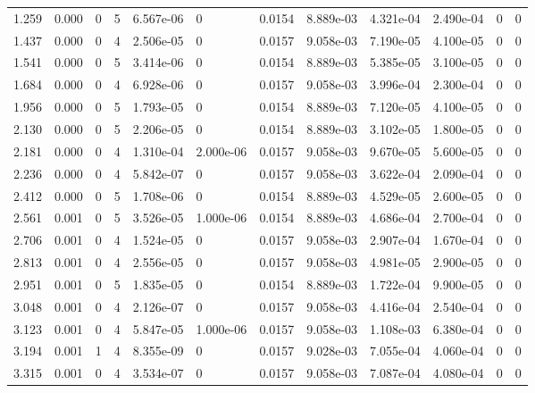 \documentclass[preview]{standalone}
\begin{document}
{{\begin{tabular}{L{1.2cm}C{1.2cm} C{0.3cm}C{0.5cm} C{1.4cm}C{1.4cm} C{1.4cm}C{1.4cm} C{1.6cm}C{1.6cm} C{1.6cm}C{1.6cm}}
  1.259  &  0.000  & 0     &  5 &  6.567e-06  & 0  &  0.0154&   8.889e-03& 4.321e-04 & 2.490e-04   &  0 & 0  \\ 
  1.437  &  0.000  & 0     &  4 &  2.506e-05  & 0  &  0.0157&   9.058e-03& 7.190e-05 & 4.100e-05   &  0 & 0  \\ 
  1.541  &  0.000  & 0     &  5 &  3.414e-06  & 0  &  0.0154&   8.889e-03& 5.385e-05 & 3.100e-05   &  0 & 0  \\ 
  1.684  &  0.000  & 0     &  4 &  6.928e-06  & 0  &  0.0157&   9.058e-03& 3.996e-04 & 2.300e-04   &  0 & 0  \\ 
  1.956  &  0.000  & 0     &  5 &  1.793e-05  & 0  &  0.0154&   8.889e-03& 7.120e-05 & 4.100e-05   &  0 & 0  \\ 
  2.130  &  0.000  & 0     &  5 &  2.206e-05  & 0  &  0.0154&   8.889e-03& 3.102e-05 & 1.800e-05   &  0 & 0  \\ 
  2.181  &  0.000  & 0     &  4 &  1.310e-04  & 2.000e-06  &  0.0157&   9.058e-03& 9.670e-05 & 5.600e-05   &  0 & 0  \\ 
  2.236  &  0.000  & 0     &  4 &  5.842e-07  & 0  &  0.0157&   9.058e-03& 3.622e-04 & 2.090e-04   &  0 & 0  \\ 
  2.412  &  0.000  & 0     &  5 &  1.708e-06  & 0  &  0.0154&   8.889e-03& 4.529e-05 & 2.600e-05   &  0 & 0  \\ 
  2.561  &  0.001  & 0     &  5 &  3.526e-05  & 1.000e-06  &  0.0154&   8.889e-03& 4.686e-04 & 2.700e-04   &  0 & 0  \\ 
  2.706  &  0.001  & 0     &  4 &  1.524e-05  & 0  &  0.0157&   9.058e-03& 2.907e-04 & 1.670e-04   &  0 & 0  \\ 
  2.813  &  0.001  & 0     &  4 &  2.556e-05  & 0  &  0.0157&   9.058e-03& 4.981e-05 & 2.900e-05   &  0 & 0  \\ 
  2.951  &  0.001  & 0     &  5 &  1.835e-05  & 0  &  0.0154&   8.889e-03& 1.722e-04 & 9.900e-05   &  0 & 0  \\ 
  3.048  &  0.001  & 0     &  4 &  2.126e-07  & 0  &  0.0157&   9.058e-03& 4.416e-04 & 2.540e-04   &  0 & 0  \\ 
  3.123  &  0.001  & 0     &  4 &  5.847e-05  & 1.000e-06  &  0.0157&   9.058e-03& 1.108e-03 & 6.380e-04   &  0 & 0  \\ 
  3.194  &  0.001  & 1     &  4 &  8.355e-09  & 0  &  0.0157&   9.028e-03& 7.055e-04 & 4.060e-04   &  0 & 0  \\ 
  3.315  &  0.001  & 0     &  4 &  3.534e-07  & 0  &  0.0157&   9.058e-03& 7.087e-04 & 4.080e-04   &  0 & 0  \\ 

\end{tabular}}}
\end{document}
